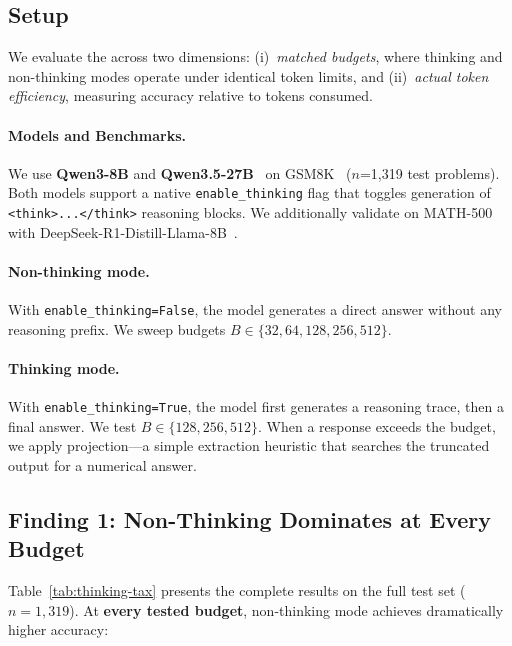 
\subsection{Setup}
\label{sec:tax-setup}

We evaluate the \thinkingtax{} across two dimensions: (i)~\emph{matched budgets}, where thinking and non-thinking modes operate under identical token limits, and (ii)~\emph{actual token efficiency}, measuring accuracy relative to tokens consumed.

\paragraph{Models and Benchmarks.}
We use \textbf{Qwen3-8B} and \textbf{Qwen3.5-27B}~\citep{qwen2025qwen3} on GSM8K~\citep{cobbe2021gsm8k} ($n$=1,319 test problems).
Both models support a native \texttt{enable\_thinking} flag that toggles generation of \texttt{<think>...</think>} reasoning blocks.
We additionally validate on MATH-500 with DeepSeek-R1-Distill-Llama-8B~\citep{deepseek2025r1}.

\paragraph{Non-thinking mode.}
With \texttt{enable\_thinking=False}, the model generates a direct answer without any reasoning prefix.
We sweep budgets $B \in \{32, 64, 128, 256, 512\}$.

\paragraph{Thinking mode.}
With \texttt{enable\_thinking=True}, the model first generates a reasoning trace, then a final answer.
We test $B \in \{128, 256, 512\}$.
When a response exceeds the budget, we apply projection---a simple extraction heuristic that searches the truncated output for a numerical answer.

\subsection{Finding 1: Non-Thinking Dominates at Every Budget}
\label{sec:finding1}



Table~\ref{tab:thinking-tax} presents the complete results on the full test set ($n{=}1{,}319$).
At \textbf{every tested budget}, non-thinking mode achieves dramatically higher accuracy:

